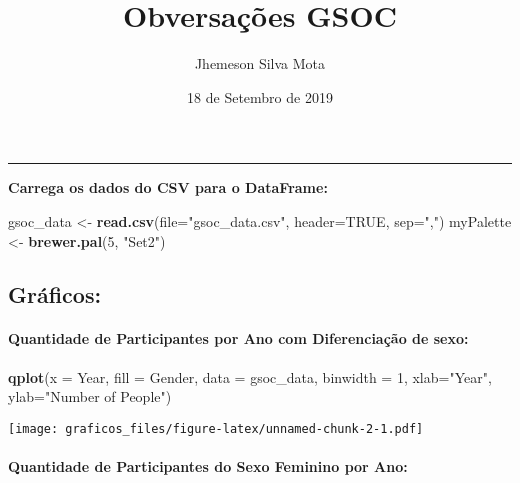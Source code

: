 \documentclass[
]{article}
\title{Obversações GSOC}
\author{Jhemeson Silva Mota}
\date{18 de Setembro de 2019}
\newenvironment{Shaded}{\begin{snugshade}}{\end{snugshade}}
\newcommand{\DataTypeTok}[1]{\textcolor[rgb]{0.13,0.29,0.53}{#1}}
\newcommand{\DecValTok}[1]{\textcolor[rgb]{0.00,0.00,0.81}{#1}}
\newcommand{\KeywordTok}[1]{\textcolor[rgb]{0.13,0.29,0.53}{\textbf{#1}}}
\newcommand{\NormalTok}[1]{#1}
\newcommand{\OtherTok}[1]{\textcolor[rgb]{0.56,0.35,0.01}{#1}}
\newcommand{\StringTok}[1]{\textcolor[rgb]{0.31,0.60,0.02}{#1}}
\begin{document}
\maketitle

\begin{center}\rule{0.5\linewidth}{0.5pt}\end{center}

\textbf{Carrega os dados do CSV para o DataFrame:}

\begin{Shaded}
\begin{Highlighting}[]
\NormalTok{gsoc_data <-}\StringTok{ }\KeywordTok{read.csv}\NormalTok{(}\DataTypeTok{file=}\StringTok{"gsoc_data.csv"}\NormalTok{, }\DataTypeTok{header=}\OtherTok{TRUE}\NormalTok{, }\DataTypeTok{sep=}\StringTok{","}\NormalTok{)}
\NormalTok{myPalette <-}\StringTok{ }\KeywordTok{brewer.pal}\NormalTok{(}\DecValTok{5}\NormalTok{, }\StringTok{"Set2"}\NormalTok{) }
\end{Highlighting}
\end{Shaded}

\hypertarget{gruxe1ficos}{%
\subsection{Gráficos:}\label{gruxe1ficos}}

\hypertarget{quantidade-de-participantes-por-ano-com-diferenciauxe7uxe3o-de-sexo}{%
\paragraph{Quantidade de Participantes por Ano com Diferenciação de
sexo:}\label{quantidade-de-participantes-por-ano-com-diferenciauxe7uxe3o-de-sexo}}

\begin{Shaded}
\begin{Highlighting}[]
\KeywordTok{qplot}\NormalTok{(}\DataTypeTok{x =}\NormalTok{ Year, }\DataTypeTok{fill =}\NormalTok{ Gender, }\DataTypeTok{data =}\NormalTok{ gsoc_data, }\DataTypeTok{binwidth =} \DecValTok{1}\NormalTok{, }\DataTypeTok{xlab=}\StringTok{"Year"}\NormalTok{, }\DataTypeTok{ylab=}\StringTok{"Number of People"}\NormalTok{)}
\end{Highlighting}
\end{Shaded}

\texttt{[image: graficos\_files/figure-latex/unnamed-chunk-2-1.pdf]}

\hypertarget{quantidade-de-participantes-do-sexo-feminino-por-ano}{%
\paragraph{Quantidade de Participantes do Sexo Feminino por
Ano:}\label{quantidade-de-participantes-do-sexo-feminino-por-ano}}
\end{document}
